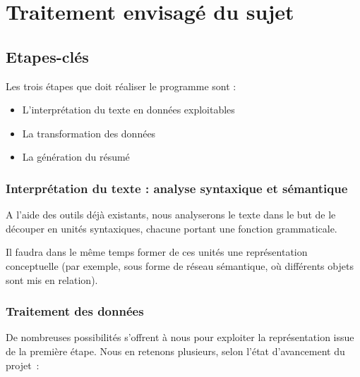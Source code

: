 \documentclass{article}           %
\begin{document}
\section{Traitement envisagé du sujet}

\subsection{Etapes-clés} %

Les trois étapes que doit réaliser le programme sont :
\begin{itemize}
 \item L'interprétation du texte en données exploitables
 \item La transformation des données
 \item La génération du résumé
\end{itemize}


\subsubsection{Interprétation du texte : analyse syntaxique et sémantique}

A l'aide des outils déjà existants, nous analyserons le texte dans le but de le découper en unités syntaxiques, chacune portant une fonction grammaticale.

Il faudra dans le même temps former de ces unités une représentation conceptuelle (par exemple, sous forme de réseau sémantique, où différents objets sont mis en relation).




\subsubsection{Traitement des données}

De nombreuses possibilités s'offrent à nous pour exploiter la représentation issue de la première étape. Nous en retenons plusieurs, selon l'état d'avancement du projet~:
\end{document}

